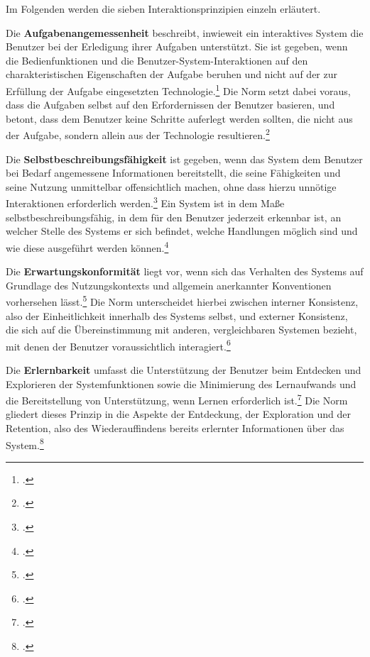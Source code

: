 Im Folgenden werden die sieben Interaktionsprinzipien einzeln erläutert.

Die \textbf{Aufgabenangemessenheit} beschreibt, inwieweit ein interaktives System die Benutzer bei der Erledigung ihrer Aufgaben unterstützt. 
Sie ist gegeben, wenn die Bedienfunktionen und die Benutzer-System-Interaktionen auf den charakteristischen Eigenschaften der Aufgabe beruhen 
und nicht auf der zur Erfüllung der Aufgabe eingesetzten Technologie.\footcite[Vgl.][Abschnitt 5.1.1]{DIN_ISO_9241-110:2020} Die Norm setzt 
dabei voraus, dass die Aufgaben selbst auf den Erfordernissen der Benutzer basieren, und betont, dass dem Benutzer keine Schritte auferlegt 
werden sollten, die nicht aus der Aufgabe, sondern allein aus der Technologie resultieren.\footcite[Vgl.][Abschnitt 5.1.1]{DIN_ISO_9241-110:2020}

Die \textbf{Selbstbeschreibungsfähigkeit} ist gegeben, wenn das System dem Benutzer bei Bedarf angemessene Informationen bereitstellt, die seine 
Fähigkeiten und seine Nutzung unmittelbar offensichtlich machen, ohne dass hierzu unnötige Interaktionen erforderlich 
werden.\footcite[Vgl.][Abschnitt 5.2.1]{DIN_ISO_9241-110:2020} Ein System ist in dem Maße selbstbeschreibungsfähig, in dem für den Benutzer 
jederzeit erkennbar ist, an welcher Stelle des Systems er sich befindet, welche Handlungen möglich sind und wie diese ausgeführt werden 
können.\footcite[Vgl.][Abschnitt 5.2.1]{DIN_ISO_9241-110:2020}

Die \textbf{Erwartungskonformität} liegt vor, wenn sich das Verhalten des Systems auf Grundlage des Nutzungskontexts und allgemein anerkannter 
Konventionen vorhersehen lässt.\footcite[Vgl.][Abschnitt 5.3.1]{DIN_ISO_9241-110:2020} Die Norm unterscheidet hierbei zwischen interner 
Konsistenz, also der Einheitlichkeit innerhalb des Systems selbst, und externer Konsistenz, die sich auf die Übereinstimmung mit anderen, 
vergleichbaren Systemen bezieht, mit denen der Benutzer voraussichtlich interagiert.\footcite[Vgl.][Abschnitt 5.3.1]{DIN_ISO_9241-110:2020}

Die \textbf{Erlernbarkeit} umfasst die Unterstützung der Benutzer beim Entdecken und Explorieren der Systemfunktionen sowie die Minimierung des 
Lernaufwands und die Bereitstellung von Unterstützung, wenn Lernen erforderlich ist.\footcite[Vgl.][Abschnitt 5.4.1]{DIN_ISO_9241-110:2020} 
Die Norm gliedert dieses Prinzip in die Aspekte der Entdeckung, der Exploration und der Retention, also des Wiederauffindens bereits erlernter 
Informationen über das System.\footcite[Vgl.][Abschnitt 5.4.1]{DIN_ISO_9241-110:2020}

